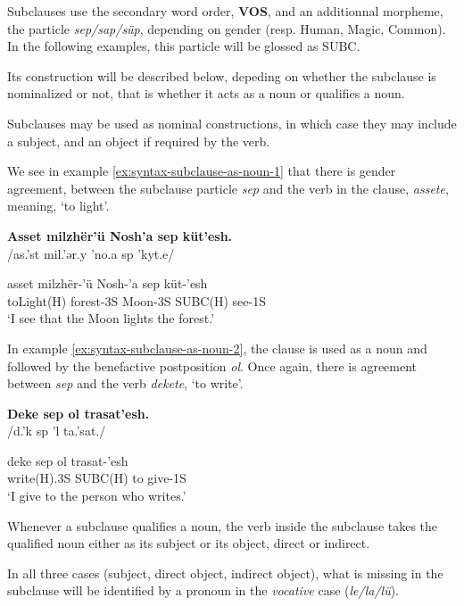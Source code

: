 Subclauses use the secondary word order, \textbf{VOS}, and an additionnal morpheme, the particle \emph{sep/sap/süp}, depending on gender (resp. Human, Magic, Common). In the following examples, this particle will be glossed as SUBC.

Its construction will be described below, depeding on whether the subclause is nominalized or not, that is whether it acts as a noun or qualifies a noun.

Subclauses may be used as nominal constructions, in which case they may include a subject, and an object if required by the verb.

We see in example \ref{ex:syntax-subclause-as-noun-1} that there is gender agreement, between the subclause particle \emph{sep} and
the verb in the clause, \emph{assete}, meaning, ‘to light’.
\begin{exe}
\ex\label{ex:syntax-subclause-as-noun-1}
\textbf{Asset milzhër’ü Nosh’a sep küt’esh.}\\
/as.'s{\ipaE}t mil.'{\ipaZ}ər.y 'no\ipaS.a s{\ipaE}p 'kyt.e\ipaS/

\gll asset milzhër-’ü Nosh-’a sep küt-’esh\\
toLight(H) forest-3S Moon-3S SUBC(H) see-1S\\
\trans ‘I see that the Moon lights the forest.’
\end{exe}

In example \ref{ex:syntax-subclause-as-noun-2}, the clause is used as a noun and followed by the benefactive postposition \emph{ol}.
Once again, there is agreement between \emph{sep} and the verb \emph{dekete}, ‘to write’.
\begin{exe}
\ex\label{ex:syntax-subclause-as-noun-2}
\textbf{Deke sep ol trasat’esh.}\\
/d{\ipaE}.'k{\ipaE} s{\ipaE}p '{\ipaO}l t{\ipaR}a.'sat.{\ipaE\ipaS}/

\gll deke sep ol trasat-’esh\\
write(H).3S SUBC(H) to give-1S\\
\trans ‘I give to the person who writes.’
\end{exe}

Whenever a subclause qualifies a noun, the verb inside the subclause takes the qualified noun either as its subject or its object, direct or indirect.

In all three cases (subject, direct object, indirect object), what is missing in the subclause will be identified by a pronoun in the \emph{vocative} case (\emph{le/la/lü}).

